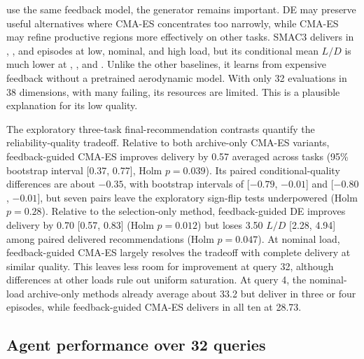 \documentclass{article} %
\begin{document}
use the same feedback model, the generator remains important. DE
may preserve useful alternatives where CMA-ES concentrates too narrowly,
while CMA-ES may refine productive regions more effectively on other
tasks.
SMAC3 delivers in \SMACLowFinalDelivered, \SMACNominalFinalDelivered, and
\SMACHighFinalDelivered{} episodes at low, nominal, and high load, but its
conditional mean $L/D$ is much lower at \SMACLowFinalMean,
\SMACNominalFinalMean, and \SMACHighFinalMean. Unlike the other baselines,
it learns from expensive feedback without a pretrained aerodynamic model.
With only 32 evaluations in 38 dimensions, with many failing,
its resources are limited. This is
a plausible explanation for its low quality.

The exploratory three-task final-recommendation contrasts quantify the
reliability-quality tradeoff.
Relative to both archive-only CMA-ES variants, feedback-guided CMA-ES improves
delivery by 0.57 averaged across tasks (95\% bootstrap interval [0.37, 0.77],
Holm $p=0.039$). Its paired conditional-quality differences are about $-0.35$,
with bootstrap intervals of [$-0.79$, $-0.01$] and [$-0.80$, $-0.01$], but seven
pairs leave the exploratory sign-flip tests underpowered (Holm $p=0.28$). Relative to the
selection-only method, feedback-guided DE improves delivery by 0.70
[0.57, 0.83] (Holm $p=0.012$) but loses 3.50 $L/D$ [2.28, 4.94] among
paired delivered recommendations (Holm $p=0.047$).
At nominal load, feedback-guided CMA-ES largely resolves the tradeoff with complete delivery at similar quality.
This leaves less room for improvement at query 32, although differences
at other loads rule out uniform saturation. At query 4, the nominal-load
archive-only methods already average about 33.2 but deliver in three or
four episodes, while feedback-guided CMA-ES delivers in all ten at 28.73.

\subsection{Agent performance over 32 queries}
\end{document}
